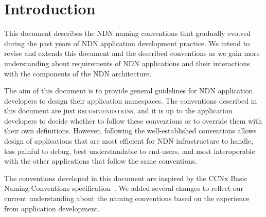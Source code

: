 \section{Introduction}
\label{sec:intro}

This document describes the NDN naming conventions that gradually evolved during the past years of NDN application development practice.
We intend to revise and extends this document and the described conventions as we gain more understanding about requirements of NDN applications and their interactions with the components of the NDN architecture.

The aim of this document is to provide general guidelines for NDN application developers to design their application namespaces.
The conventions described in this document are just \textsc{recommendations}, and it is up to the application developers to decide whether to follow these conventions or to override them with their own definitions.
However, following the well-established conventions allows design of applications that are most efficient for NDN infrastructure to handle, less painful to debug, best understandable to end-users, and most interoperable with the other applications that follow the same conventions.

The conventions developed in this document are inspired by the CCNx Basic Naming Conventions specification~\cite{ccnx-naming-conventions}.
We added several changes to reflect our current understanding about the naming conventions based on the experience from application development.


